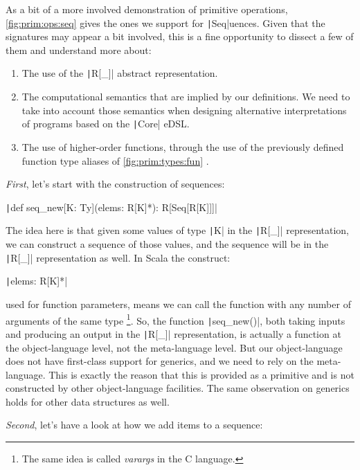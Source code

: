 \documentclass[11pt]{article}
\renewcommand{\vref}[1]{\autoref{#1} \vpageref{#1}}{}
\newcommand{\ScalaI}[1]{\texttt|#1|}
\newcommand{\OneTwoThreeX}[1]{\marginpar{\faCubes{ \smaller #1}}\xspace}
\newcommand{\OneTwoThree}{\OneTwoThreeX{}}
\newcommand{\FirstEtcX}[1]{\marginpar{\faCube{ \smaller #1}}\xspace}
\newcommand{\FirstEtc}{\FirstEtcX{}}
\begin{document}
As a bit of a more involved demonstration of primitive operations, \vref{fig:prim:ops:seq} gives the ones we support for \ScalaI{Seq}uences. Given that the signatures may appear a bit involved, this is a fine opportunity to dissect a few of them and understand more\OneTwoThree about:
\begin{enumerate}
  \item The use of the \ScalaI{R[_]} abstract representation.

  \item The computational semantics that are implied by our definitions. We need to take into account those semantics when designing alternative interpretations of programs based on the \ScalaI{Core} eDSL.
  
  \item The use of higher-order functions, through the use of the previously defined function type aliases of \vref{fig:prim:types:fun}.
\end{enumerate}

\textit{First}\FirstEtc, let's start with the construction of sequences:

\par\ScalaI{def seq_new[K: Ty](elems: R[K]*): R[Seq[R[K]]]}

\noindent The idea here is that given some values of type \ScalaI{K} in the \ScalaI{R[_]} representation, we can construct a sequence of those values, and the sequence will be in the \ScalaI{R[_]} representation as well. In Scala the construct: 

\par\ScalaI{elems: R[K]*}

\noindent used for function parameters, means we can call the function with any number of arguments of the same type%
\footnote{The same idea is called \textit{varargs} in the C language.}.
So, the function \ScalaI{seq_new()}, both taking inputs and producing an output in the \ScalaI{R[_]} representation, is actually a function at the object-language level, not the meta-language level. But our object-language does not have first-class support for generics, and we need to rely on the meta-language. This is exactly the reason that this is provided as a primitive and is not constructed by other object-language facilities. The same observation on generics holds for other data structures as well.

\textit{Second}\FirstEtc, let's have a look at how we add items to a sequence:
\end{document}
